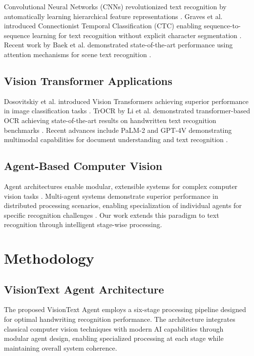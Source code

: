 \documentclass[10pt,twocolumn]{article}
\begin{document}
Convolutional Neural Networks (CNNs) revolutionized text recognition by automatically learning hierarchical feature representations \cite{lecun1998gradient}. Graves et al. introduced Connectionist Temporal Classification (CTC) enabling sequence-to-sequence learning for text recognition without explicit character segmentation \cite{graves2006connectionist}. Recent work by Baek et al. demonstrated state-of-the-art performance using attention mechanisms for scene text recognition \cite{baek2019wrong}.

\subsection{Vision Transformer Applications}

Dosovitskiy et al. introduced Vision Transformers achieving superior performance in image classification tasks \cite{dosovitskiy2020image}. TrOCR by Li et al. demonstrated transformer-based OCR achieving state-of-the-art results on handwritten text recognition benchmarks \cite{li2021trocr}. Recent advances include PaLM-2 and GPT-4V demonstrating multimodal capabilities for document understanding and text recognition \cite{chen2023pali}.

\subsection{Agent-Based Computer Vision}

Agent architectures enable modular, extensible systems for complex computer vision tasks \cite{wooldridge2009introduction}. Multi-agent systems demonstrate superior performance in distributed processing scenarios, enabling specialization of individual agents for specific recognition challenges \cite{stone2000multiagent}. Our work extends this paradigm to text recognition through intelligent stage-wise processing.

\section{\large Methodology}

\subsection{VisionText Agent Architecture}

The proposed VisionText Agent employs a six-stage processing pipeline designed for optimal handwriting recognition performance. The architecture integrates classical computer vision techniques with modern AI capabilities through modular agent design, enabling specialized processing at each stage while maintaining overall system coherence.
\end{document}
